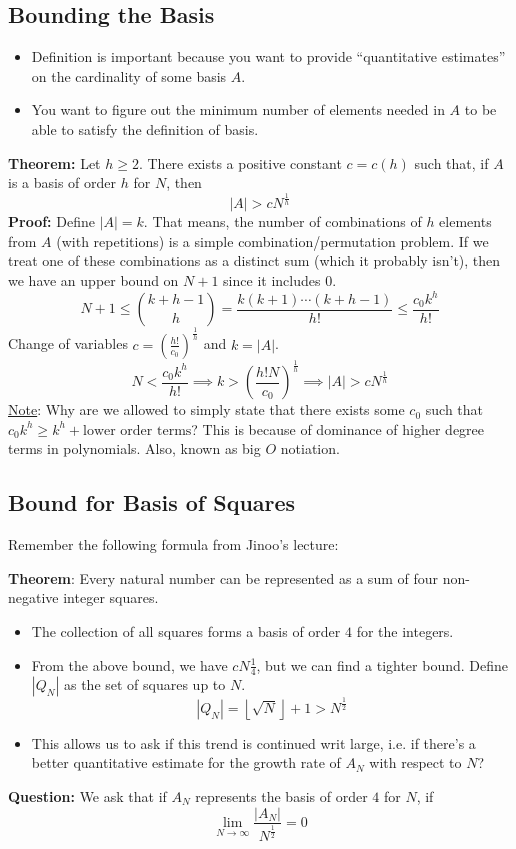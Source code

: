 \documentclass[8pt]{extarticle}
\begin{document}
\subsection{Bounding the Basis}
\begin{itemize}
    \item Definition is important because you want to provide ``quantitative estimates'' on the cardinality of some basis $A$. 
    \item You want to figure out the minimum number of elements needed in $A$ to be able to satisfy the definition of basis. 
\end{itemize}
\begin{boxedsection}
    \textbf{Theorem:} Let $h \geq 2$. There exists a positive constant $c = c(h)$ such that, if $A$ is a basis of order $h$ for $N$, then
    $$
    |A| > cN^{\frac{1}{h}}
    $$
    \textbf{Proof:} Define $|A| = k$. That means, the number of combinations of $h$ elements from $A$ (with repetitions) is a simple combination/permutation problem. If we treat one of these combinations as a distinct sum (which it probably isn't), then we have an upper bound on $N+1$ since it includes $0$.
    $$
    N+1 \leq {k+h-1 \choose h} = \frac{k(k+1)\cdots(k+h-1)}{h!} \leq \frac{c_0k^h}{h!}
    $$
Change of variables $c = \left(\frac{h!}{c_0}\right)^{\frac{1}{h}}$ and $k = |A|$. 
    $$
    N < \frac{c_0k^h}{h!} \implies k > \left(\frac{h! N}{c_0}\right)^{\frac{1}{h}} \implies |A| > cN^{\frac{1}{h}}
    $$
    \underline{Note}: Why are we allowed to simply state that there exists some $c_0$ such that $c_0k^h \geq k^h + \text{lower order terms}$? This is because of dominance of higher degree terms in polynomials. Also, known as big $O$ notiation.
\end{boxedsection}
\subsection{Bound for Basis of Squares}
Remember the following formula from Jinoo's lecture:
\begin{boxedsection}
    \textbf{Theorem}: Every natural number can be represented as a sum of four non-negative integer squares.
\end{boxedsection}
\begin{itemize}
    \item The collection of all squares forms a basis of order $4$ for the integers. 
    \item From the above bound, we have $c N \frac{1}{4}$, but we can find a tighter bound. Define $|Q_N|$ as the set of squares up to $N$.
    $$
    |Q_N| = \left\lfloor \sqrt{N} \right\rfloor + 1 > N^{\frac{1}{2}}
    $$
    \item This allows us to ask if this trend is continued writ large, i.e. if there's a better quantitative estimate for the growth rate of $A_N$ with respect to $N$?
\end{itemize}
\begin{boxedsection}
    \textbf{Question:} We ask that if $A_N$ represents the basis of order $4$ for $N$, if 
    $$
    \lim_{N\rightarrow\infty} \frac{|A_N|}{N^{\frac{1}{2}}} = 0
    $$
\end{boxedsection}
\end{document}
